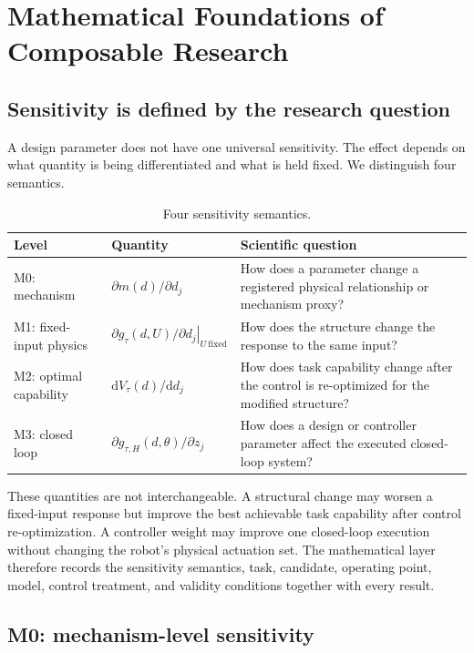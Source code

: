 \section{Mathematical Foundations of Composable Research}
\label{sec:math}

\subsection{Sensitivity is defined by the research question}

A design parameter does not have one universal sensitivity. The effect depends on what quantity is being differentiated and what is held fixed. We distinguish four semantics.

\begin{table}[t]
\centering
\caption{Four sensitivity semantics.}
\label{tab:sensitivity}
\small
\begin{tabularx}{\textwidth}{@{}l l Y@{}}
\toprule
Level & Quantity & Scientific question \\
\midrule
M0: mechanism & $\partial m(d)/\partial d_j$ & How does a parameter change a registered physical relationship or mechanism proxy? \\
M1: fixed-input physics & $\left.\partial g_\tau(d,U)/\partial d_j\right|_{U\ \mathrm{fixed}}$ & How does the structure change the response to the same input? \\
M2: optimal capability & $\mathrm{d}V_\tau(d)/\mathrm{d}d_j$ & How does task capability change after the control is re-optimized for the modified structure? \\
M3: closed loop & $\partial g_{\tau,H}(d,\theta)/\partial z_j$ & How does a design or controller parameter affect the executed closed-loop system? \\
\bottomrule
\end{tabularx}
\end{table}

These quantities are not interchangeable. A structural change may worsen a fixed-input response but improve the best achievable task capability after control re-optimization. A controller weight may improve one closed-loop execution without changing the robot's physical actuation set. The mathematical layer therefore records the sensitivity semantics, task, candidate, operating point, model, control treatment, and validity conditions together with every result.

\subsection{M0: mechanism-level sensitivity}

